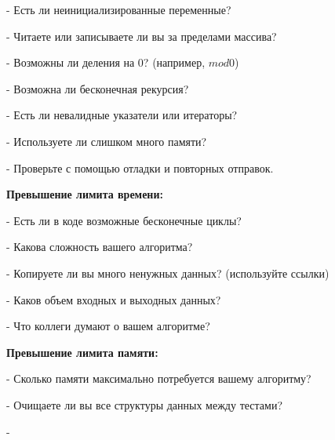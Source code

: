 - Есть ли неинициализированные переменные?  

- Читаете или записываете ли вы за пределами массива?  

- Возможны ли деления на 0? (например, $mod 0$)  

- Возможна ли бесконечная рекурсия?  

- Есть ли невалидные указатели или итераторы?  

- Используете ли слишком много памяти?  

- Проверьте с помощью отладки и повторных отправок.  

\textbf{Превышение лимита времени:}  

- Есть ли в коде возможные бесконечные циклы?  

- Какова сложность вашего алгоритма?  

- Копируете ли вы много ненужных данных? (используйте ссылки)  

- Каков объем входных и выходных данных?

- Что коллеги думают о вашем алгоритме?  

\textbf{Превышение лимита памяти:}  

- Сколько памяти максимально потребуется вашему алгоритму?  

- Очищаете ли вы все структуры данных между тестами? 

-
